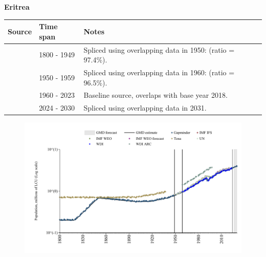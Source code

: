 \documentclass[12pt,a4paper,landscape]{article}
\begin{document}
\begin{adjustbox}{max totalsize={\paperwidth}{\paperheight},center}
\begin{minipage}[t][\textheight][t]{\textwidth}
\vspace*{0.5cm}
{}
\begin{center}
{\Large\bfseries Eritrea}
\end{center}
\vspace{0.5cm}
\begin{table}[H]
\centering
\small
\begin{tabular}{|l|l|l|}
\hline
\textbf{Source} & \textbf{Time span} & \textbf{Notes} \\
\hline
\rowcolor{white}\cite{Gapminder}& 1800 - 1949 &Spliced using overlapping data in 1950: (ratio = 97.4\%).\\
\rowcolor{lightgray}\cite{IMF_IFS}& 1950 - 1959 &Spliced using overlapping data in 1960: (ratio = 96.5\%).\\
\rowcolor{white}\cite{WDI}& 1960 - 2023 &Baseline source, overlaps with base year 2018.\\
\rowcolor{lightgray}\cite{Gapminder}& 2024 - 2030 &Spliced using overlapping data in 2031.\\
\hline
\end{tabular}
\end{table}
\begin{figure}[H]
\centering
\includegraphics[width=\textwidth,height=0.6\textheight,keepaspectratio]{graphs/ERI_pop.pdf}
\end{figure}
\end{minipage}
\end{adjustbox}
\end{document}
